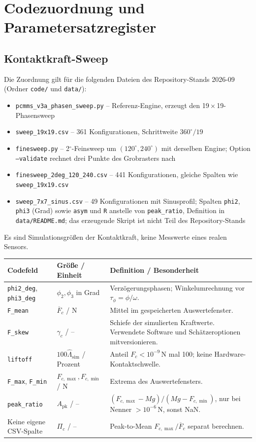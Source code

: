 \documentclass[11pt,a4paper]{article}
\begin{document}
\section{Codezuordnung und Parametersatzregister}\label{app:code}
\subsection{Kontaktkraft-Sweep}
Die Zuordnung gilt für die folgenden Dateien des Repository-Stands 2026-09 (Ordner \texttt{code/} und \texttt{data/}):
\begin{itemize}
\item \texttt{pcmms\_v3a\_phasen\_sweep.py} -- Referenz-Engine, erzeugt den 19\,$\times$\,19-Phasensweep
\item \texttt{sweep\_19x19.csv} -- 361 Konfigurationen, Schrittweite $360^\circ/19$
\item \texttt{finesweep.py} -- 2$^\circ$-Feinsweep um $(120^\circ,240^\circ)$ mit derselben Engine; Option \texttt{--validate} rechnet drei Punkte des Grobrasters nach
\item \texttt{finesweep\_2deg\_120\_240.csv} -- 441 Konfigurationen, gleiche Spalten wie \texttt{sweep\_19x19.csv}
\item \texttt{sweep\_7x7\_sinus.csv} -- 49 Konfigurationen mit Sinusprofil; Spalten \texttt{phi2}, \texttt{phi3} (Grad) sowie \texttt{asym} und \texttt{R} anstelle von \texttt{peak\_ratio}, Definition in \texttt{data/README.md}; das erzeugende Skript ist nicht Teil des Repository-Stands
\end{itemize} Es sind Simulationsgrößen der Kontaktkraft, keine Messwerte eines realen Sensors.
\begin{longtable}{@{}L{.24\textwidth}L{.24\textwidth}L{.47\textwidth}@{}}
\toprule\textbf{Codefeld}&\textbf{Größe / Einheit}&\textbf{Definition / Besonderheit}\\\midrule\endhead
\texttt{phi2\_deg}, \texttt{phi3\_deg}&$\phi_2,\phi_3$ in Grad&Verzögerungsphasen; Winkelumrechnung vor $\tau_\phi=\phi/\omega$.\\
\texttt{F\_mean}&$\overline F_c$ / N&Mittel im gespeicherten Auswertefenster.\\
\texttt{F\_skew}&$\gamma_c$ / --&Schiefe der simulierten Kraftwerte. Verwendete Software und Schätzeroptionen mitversionieren.\\
\texttt{liftoff}&$100\hat\Lambda_{\mathrm{sim}}$ / Prozent&Anteil $F_c<10^{-9}\,\mathrm N$ mal 100; keine Hardware-Kontaktschwelle.\\
\texttt{F\_max}, \texttt{F\_min}&$F_{c,\max},F_{c,\min}$ / N&Extrema des Auswertefensters.\\
\texttt{peak\_ratio}&$A_{\mathrm{pk}}$ / --&$(F_{c,\max}-Mg)/(Mg-F_{c,\min})$, nur bei Nenner $>10^{-6}\,\mathrm N$, sonst NaN.\\
Keine eigene CSV-Spalte&$\Pi_c$ / --&Peak-to-Mean $F_{c,\max}/\overline F_c$ separat berechnen.\\
\bottomrule\end{longtable}
\end{document}

